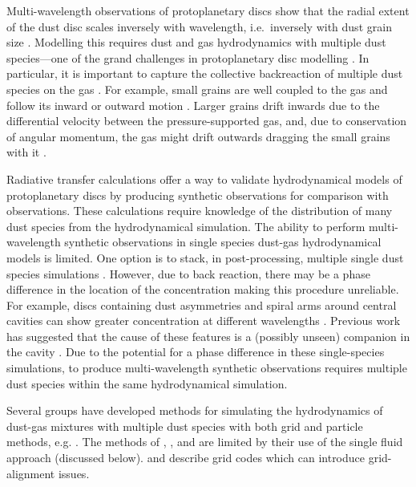 \documentclass[fleqn,usenatbib]{mnras}
\begin{document}
Multi-wavelength observations of protoplanetary discs show that the radial
extent of the dust disc scales inversely with wavelength, i.e.\ inversely with
dust grain size \citep{Andrews2015PASP..127..961A}. Modelling this requires dust
and gas hydrodynamics with multiple dust species---one of the grand challenges
in protoplanetary disc modelling \citep{Haworth2016PASA...33...53H}. In
particular, it is important to capture the collective backreaction of multiple
dust species on the gas \citep{Dipierro2018MNRAS.479.4187D}. For example, small
grains are well coupled to the gas and follow its inward or outward motion
\citep{Weidenschilling1977MNRAS.180...57W}. Larger grains drift inwards due to
the differential velocity between the pressure-supported gas, and, due to
conservation of angular momentum, the gas might drift outwards dragging the
small grains with it \citep{Laibe2014MNRAS.444.1940L}.

Radiative transfer calculations offer a way to validate hydrodynamical models of
protoplanetary discs by producing synthetic observations for comparison with
observations. These calculations require knowledge of the distribution of many
dust species from the hydrodynamical simulation. The ability to perform
multi-wavelength synthetic observations in single species dust-gas
hydrodynamical models is limited. One option is to stack, in post-processing,
multiple single dust species simulations \citep{Dipierro2015MNRAS.453L..73D,
Mentiplay2019MNRAS.484L.130M}. However, due to back reaction, there may be a
phase difference in the location of the concentration making this procedure
unreliable. For example, discs containing dust asymmetries and spiral arms
around central cavities can show greater concentration at different wavelengths
\citep{Casassus2015ApJ...812..126C, van-der-Marel2015ApJ...810L...7V}. Previous
work has suggested that the cause of these features is a (possibly unseen)
companion in the cavity \citep{Price2018MNRAS.477.1270P,
Poblete2019MNRAS.489.2204P,Calcino2019MNRAS.490.2579C}. Due to the potential for
a phase difference in these single-species simulations, to produce
multi-wavelength synthetic observations requires multiple dust species within
the same hydrodynamical simulation.

Several groups have developed methods for simulating the hydrodynamics of
dust-gas mixtures with multiple dust species with both grid and particle
methods, e.g. \citet{Bai2010ApJS..190..297B, Porth2014ApJS..214....4P,
Hutchison2018MNRAS.476.2186H, Benitez-Llambay2019ApJS..241...25B,
Lebreuilly2019A&A...626A..96L, Li2019ApJ...878...39L}. The methods of
\citet{Benitez-Llambay2019ApJS..241...25B},
\citet{Lebreuilly2019A&A...626A..96L}, and \citet{Li2019ApJ...878...39L} are
limited by their use of the single fluid approach (discussed below).
\citet{Bai2010ApJS..190..297B} and \citet{Porth2014ApJS..214....4P} describe
grid codes which can introduce grid-alignment issues.
\end{document}
